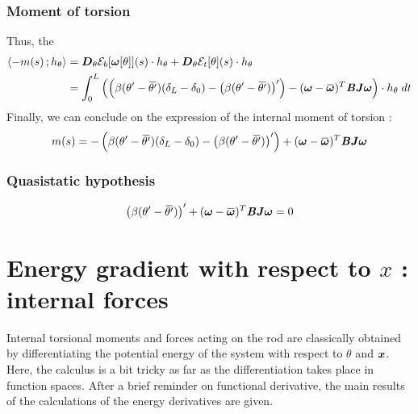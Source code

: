 \subsubsection{Moment of torsion}
Thus, the
\begin{equation}
	\begin{aligned}
	\scalar{-m(s)}{h_\theta} &= \pdiffof{\theta}{\mathcal{E}_b[\vect{\omega}[\theta]]}{s}{h_\theta} + \pdiffof{\theta}{\mathcal{E}_t[\theta]}{s}{h_\theta} \\
	&= \int_{0}^{L} \left(\left(\beta(\theta' -{\overbar{\theta'}})(\delta_L-\delta_0) - \left(\beta(\theta' -{\overbar{\theta'}})\right)'\right) - (\vect{\omega} - \overbar{\vect{\omega}})^T \mat{B} \mat{J}\vect{\omega}\right) \cdot h_\theta \;dt
	\end{aligned}
\end{equation}
Finally, we can conclude on the expression of the internal moment of torsion :
\begin{equation}
	m(s) = - \left(\beta(\theta' -{\overbar{\theta'}})(\delta_L-\delta_0) - \left(\beta(\theta' -{\overbar{\theta'}})\right)'\right) + (\vect{\omega} - \overbar{\vect{\omega}})^T \mat{B} \mat{J}\vect{\omega}
\end{equation}

\subsubsection{Quasistatic hypothesis}
\begin{equation}
	\left(\beta(\theta' -{\overbar{\theta'}})\right)' + (\vect{\omega} - \overbar{\vect{\omega}})^T \mat{B} \mat{J}\vect{\omega} = 0
\end{equation}





\section{Energy gradient with respect to $x$ : internal forces}

Internal torsional moments and forces acting on the rod are classically obtained by differentiating the potential energy of the system with respect to $\theta$ and $\boldsymbol{x}$. Here, the calculus is a bit tricky as far as the differentiation takes place in function spaces. After a brief reminder on functional derivative, the main results of the calculations of the energy derivatives are given.

